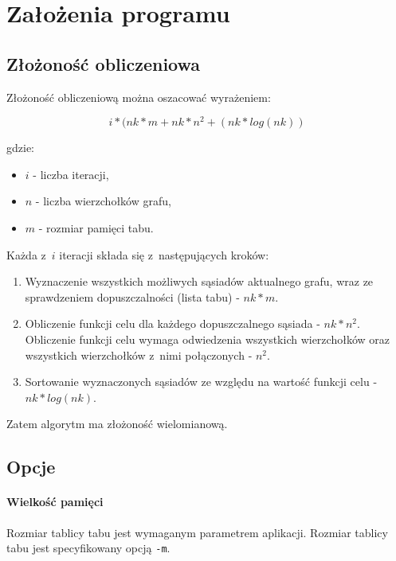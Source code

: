 \section{Założenia programu}

\subsection{Złożoność obliczeniowa}

Złożoność obliczeniową można oszacować wyrażeniem:

\begin{equation}
	i * (nk * m + nk * n^2 + (nk * log(nk))
\end{equation}

\noindent gdzie:

\begin{itemize}
 \item $i$ - liczba iteracji,
 \item $n$ - liczba wierzchołków grafu,
 \item $m$ - rozmiar pamięci tabu.
\end{itemize}

\noindent Każda z~$i$ iteracji składa się z~następujących kroków:

\begin{enumerate}
 \item Wyznaczenie wszystkich możliwych sąsiadów aktualnego grafu, wraz ze sprawdzeniem dopuszczalności (lista tabu) - $nk * m$.
 \item Obliczenie funkcji celu dla każdego dopuszczalnego sąsiada - $nk * n^2$. Obliczenie funkcji celu wymaga odwiedzenia wszystkich wierzchołków oraz wszystkich wierzchołków z~nimi połączonych - $n^2$.
 \item Sortowanie wyznaczonych sąsiadów ze względu na wartość funkcji celu - $nk * log(nk)$.
\end{enumerate}

\noindent Zatem algorytm ma złożoność wielomianową. 

\subsection{Opcje}

\paragraph{Wielkość pamięci}

Rozmiar tablicy tabu jest wymaganym parametrem aplikacji. Rozmiar tablicy tabu jest specyfikowany opcją \verb+-m+. 

